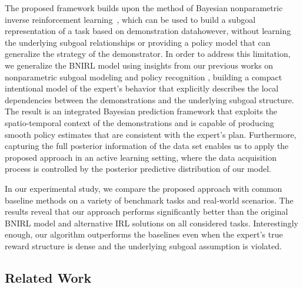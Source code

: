 \documentclass[twoside,11pt]{article}
\newcommand{\nachschub}[1]{\Emdash*#1}
\begin{document}
The %
proposed framework builds upon %
the method of Bayesian nonparametric inverse reinforcement learning~\citep[BNIRL,][]{michini2012bayesian}, which can be used to build a subgoal representation of a task %
based on demonstration data\nachschub{however,
%
%
%
without %
learning %
the underlying subgoal relationships %
or providing a policy model %
that can generalize the %
%
strategy of the %
demonstrator.}
%
%
%
%
%
In order to address this limitation, we generalize the BNIRL model using insights from our previous works on nonparametric subgoal modeling \citep{sosic2018} and policy recognition \citep{sosic2018pami}, building a compact intentional model of the expert's behavior that explicitly describes the local dependencies between the demonstrations and the underlying subgoal structure.
%
%
%
The result is an integrated Bayesian prediction framework %
that  %
%
exploits the spatio-temporal context of the %
demonstrations and is %
capable of producing smooth policy estimates that are consistent with the expert's plan. Furthermore, capturing the full posterior information of the data set enables us to apply the proposed approach in an active learning setting, where the data acquisition process is %
controlled by the posterior predictive distribution of our model.

 In our experimental study, we compare the proposed approach with common baseline methods on a variety of benchmark tasks and real-world scenarios. The results reveal that our approach performs significantly better than the original BNIRL model and alternative IRL solutions on all considered tasks. 
%
Interestingly enough, our algorithm %
%
outperforms the baselines %
%
%
even when the expert's true reward structure %
is dense and the underlying subgoal 
assumption is violated. %
%
%
%


%
%
%

%
%
%
%
%

%
%




%
%
%
%
%

%
%
%
%
%
%
%



\subsection{Related Work}
\end{document}
